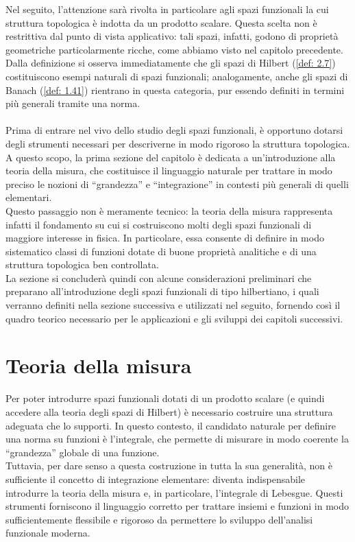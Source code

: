 \documentclass[a4paper,12pt]{report}
\begin{document}
Nel seguito, l’attenzione sarà rivolta in particolare agli spazi funzionali la cui struttura topologica è indotta da un prodotto scalare. Questa scelta non è restrittiva dal punto di vista applicativo: tali spazi, infatti, godono di proprietà geometriche particolarmente ricche, come abbiamo visto nel capitolo precedente.
\\Dalla definizione si osserva immediatamente che gli spazi di Hilbert (\ref{def: 2.7}) costituiscono esempi naturali di spazi funzionali; analogamente, anche gli spazi di Banach (\ref{def: 1.41}) rientrano in questa categoria, pur essendo definiti in termini più generali tramite una norma.
\\
\\ Prima di entrare nel vivo dello studio degli spazi funzionali, è opportuno dotarsi degli strumenti necessari per descriverne in modo rigoroso la struttura topologica. A questo scopo, la prima sezione del capitolo è dedicata a un’introduzione alla teoria della misura, che costituisce il linguaggio naturale per trattare in modo preciso le nozioni di “grandezza” e “integrazione” in contesti più generali di quelli elementari.
\\Questo passaggio non è meramente tecnico: la teoria della misura rappresenta infatti il fondamento su cui si costruiscono molti degli spazi funzionali di maggiore interesse in fisica. In particolare, essa consente di definire in modo sistematico classi di funzioni dotate di buone proprietà analitiche e di una struttura topologica ben controllata.
\\La sezione si concluderà quindi con alcune considerazioni preliminari che preparano all’introduzione degli spazi funzionali di tipo hilbertiano, i quali verranno definiti nella sezione successiva e utilizzati nel seguito, fornendo così il quadro teorico necessario per le applicazioni e gli sviluppi dei capitoli successivi.

\newpage

\section{Teoria della misura}

Per poter introdurre spazi funzionali dotati di un prodotto scalare (e quindi accedere alla teoria degli spazi di Hilbert) è necessario costruire una struttura adeguata che lo supporti. In questo contesto, il candidato naturale per definire una norma su funzioni è l’integrale, che permette di misurare in modo coerente la “grandezza” globale di una funzione.
\\Tuttavia, per dare senso a questa costruzione in tutta la sua generalità, non è sufficiente il concetto di integrazione elementare: diventa indispensabile introdurre la teoria della misura e, in particolare, l’integrale di Lebesgue. Questi strumenti forniscono il linguaggio corretto per trattare insiemi e funzioni in modo sufficientemente flessibile e rigoroso da permettere lo sviluppo dell’analisi funzionale moderna.
\end{document}
